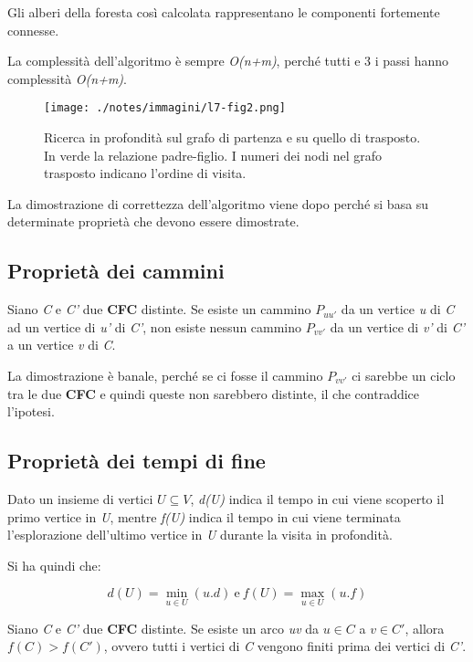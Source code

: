 Gli alberi della foresta così calcolata rappresentano le componenti
fortemente connesse.

La complessità dell'algoritmo è sempre \emph{O(n+m)}, perché tutti e 3 i
passi hanno complessità \emph{O(n+m)}.

\begin{figure}[htbp]
\centering
\texttt{[image: ./notes/immagini/l7-fig2.png]}
\caption{Ricerca in profondità sul grafo di partenza e su quello di
trasposto. In verde la relazione padre-figlio. I numeri dei nodi nel
grafo trasposto indicano l'ordine di visita.}
\end{figure}

La dimostrazione di correttezza dell'algoritmo viene dopo perché si basa
su determinate proprietà che devono essere dimostrate.

\subsection{Proprietà dei cammini}\label{proprietuxe0-dei-cammini}

Siano \emph{C} e \emph{C'} due \textbf{CFC} distinte. Se esiste un
cammino $P_{uu'}$ da un vertice \emph{u} di \emph{C} ad un vertice
di \emph{u'} di \emph{C'}, non esiste nessun cammino $P_{vv'}$ da un
vertice di \emph{v'} di \emph{C'} a un vertice \emph{v} di \emph{C}.

La dimostrazione è banale, perché se ci fosse il cammino $P_{vv'}$
ci sarebbe un ciclo tra le due \textbf{CFC} e quindi queste non
sarebbero distinte, il che contraddice l'ipotesi.

\subsection{Proprietà dei tempi di fine}\label{prorpietuxe0-dei-tempi-di-fine}

Dato un insieme di vertici $ U \subseteq V $, \textit{d(U)} indica il tempo in cui viene scoperto il primo vertice in \textit{U}, mentre \textit{f(U)} indica il tempo in cui viene terminata l'esplorazione dell'ultimo vertice in \textit{U} durante la visita in profondità.

Si ha quindi che:

$$
d(U) = \min_{u \in U} (u.d) \: \text{e} \: f(U) = \max_{u \in U}(u.f)
$$

Siano \emph{C} e \emph{C'} due \textbf{CFC} distinte. Se esiste un arco
\emph{uv} da $u \in C$ a $v \in C'$, allora $f(C) > f(C')$, ovvero tutti i vertici di \emph{C}
vengono finiti prima dei vertici di \emph{C'}.


